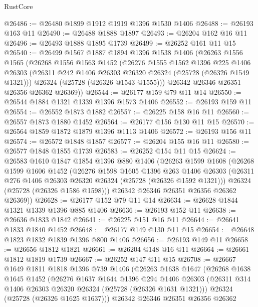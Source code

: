 \begin{lexlean}{RustCore}
\begin{coremodule}
@26486 := @26480 @1899 @1912 @1919 @1396 @1530 @1406
@26488 := @26193 @163 @11
@26490 := @26488 @1888 @1897
@26493 := @26204 @162 @16 @11
@26496 := @26493 @1888 @1895 @1739
@26499 := @26252 @161 @11 @15
@26540 := @26499
    @1567
    @1887
    @1894
    @1396
    @1538
    @1406
    (@26263
      @1556
      @1565
      (@26268
        @1556
        @1563
        @1452
        (@26276
          @1555
          @1562
          @1396
          @225
          @1406
          @26303
          (@26311 @242 @1406 @26303 @26320 @26324 (@25728 (@26326 @1549 @1321)))
          @26324
          (@25728 (@26326 @1543 @1555)))
        @26342
        @26346
        @26351
        @26356
        @26362
        @26369))
@26544 := @26177 @159 @79 @11 @14
@26550 := @26544 @1884 @1321 @1339 @1396 @1573 @1406
@26552 := @26193 @159 @11
@26554 := @26552 @1873 @1882
@26557 := @26225 @158 @16 @11
@26560 := @26557 @1873 @1880 @1452
@26564 := @26177 @156 @130 @11 @15
@26570 := @26564 @1859 @1872 @1879 @1396 @1113 @1406
@26572 := @26193 @156 @11
@26574 := @26572 @1848 @1857
@26577 := @26204 @155 @16 @11
@26580 := @26577 @1848 @1855 @1739
@26583 := @26252 @154 @11 @15
@26624 := @26583
    @1610
    @1847
    @1854
    @1396
    @880
    @1406
    (@26263
      @1599
      @1608
      (@26268
        @1599
        @1606
        @1452
        (@26276
          @1598
          @1605
          @1396
          @263
          @1406
          @26303
          (@26311 @276 @1406 @26303 @26320 @26324 (@25728 (@26326 @1592 @1321)))
          @26324
          (@25728 (@26326 @1586 @1598)))
        @26342
        @26346
        @26351
        @26356
        @26362
        @26369))
@26628 := @26177 @152 @79 @11 @14
@26634 := @26628 @1844 @1321 @1339 @1396 @885 @1406
@26636 := @26193 @152 @11
@26638 := @26636 @1833 @1842
@26641 := @26225 @151 @16 @11
@26644 := @26641 @1833 @1840 @1452
@26648 := @26177 @149 @130 @11 @15
@26654 := @26648 @1823 @1832 @1839 @1396 @800 @1406
@26656 := @26193 @149 @11
@26658 := @26656 @1812 @1821
@26661 := @26204 @148 @16 @11
@26664 := @26661 @1812 @1819 @1739
@26667 := @26252 @147 @11 @15
@26708 := @26667
    @1649
    @1811
    @1818
    @1396
    @739
    @1406
    (@26263
      @1638
      @1647
      (@26268
        @1638
        @1645
        @1452
        (@26276
          @1637
          @1644
          @1396
          @294
          @1406
          @26303
          (@26311 @314 @1406 @26303 @26320 @26324 (@25728 (@26326 @1631 @1321)))
          @26324
          (@25728 (@26326 @1625 @1637)))
        @26342
        @26346
        @26351
        @26356
        @26362

\end{coremodule}
\end{lexlean}
